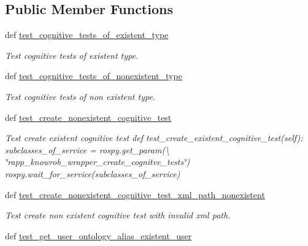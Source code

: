 \subsection*{Public Member Functions}
\begin{DoxyCompactItemize}
\item 
def \hyperlink{classcognitive__exercise__system__knowrob__services__functional__tests_1_1OntologyFunc_a55d3ca0e805f218c0334a17e6a5ad73f}{test\-\_\-cognitive\-\_\-tests\-\_\-of\-\_\-existent\-\_\-type}
\begin{DoxyCompactList}\small\item\em Test cognitive tests of existent type. \end{DoxyCompactList}\item 
def \hyperlink{classcognitive__exercise__system__knowrob__services__functional__tests_1_1OntologyFunc_a651c94c6b07b35dd8b9b3a66045ac502}{test\-\_\-cognitive\-\_\-tests\-\_\-of\-\_\-nonexistent\-\_\-type}
\begin{DoxyCompactList}\small\item\em Test cognitive tests of non existent type. \end{DoxyCompactList}\item 
def \hyperlink{classcognitive__exercise__system__knowrob__services__functional__tests_1_1OntologyFunc_af4ed2d90b352171d1cd40a6bc09f951d}{test\-\_\-create\-\_\-nonexistent\-\_\-cognitive\-\_\-test}
\begin{DoxyCompactList}\small\item\em Test create existent cognitive test def test\-\_\-create\-\_\-existent\-\_\-cognitive\-\_\-test(self)\-: subclasses\-\_\-of\-\_\-service = rospy.\-get\-\_\-param(\textbackslash{} \char`\"{}rapp\-\_\-knowrob\-\_\-wrapper\-\_\-create\-\_\-cognitve\-\_\-tests\char`\"{}) rospy.\-wait\-\_\-for\-\_\-service(subclasses\-\_\-of\-\_\-service) \end{DoxyCompactList}\item 
def \hyperlink{classcognitive__exercise__system__knowrob__services__functional__tests_1_1OntologyFunc_a60ac919b56f4153fb3c7e5f7149eedb3}{test\-\_\-create\-\_\-nonexistent\-\_\-cognitive\-\_\-test\-\_\-xml\-\_\-path\-\_\-nonexistent}
\begin{DoxyCompactList}\small\item\em Test create non existent cognitive test with invalid xml path. \end{DoxyCompactList}\item 
def \hyperlink{classcognitive__exercise__system__knowrob__services__functional__tests_1_1OntologyFunc_a3c9113598b5d2f42d439a4965db22d9d}{test\-\_\-get\-\_\-user\-\_\-ontology\-\_\-alias\-\_\-existent\-\_\-user}

\end{DoxyCompactItemize}
